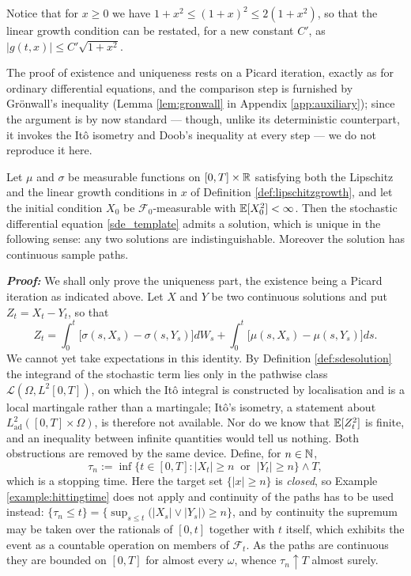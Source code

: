  Notice that for $x\geq 0$ we have $1+x^2 \leq (1+x) ^2 \leq 2(1+x^2)$, so that the linear growth condition can be restated, for a new constant $C'$, as $|g(t,x)| \leq C' \sqrt{1+x^2}.$

The proof of existence and uniqueness rests on a Picard iteration, exactly as for ordinary differential equations, and the comparison step is furnished by Grönwall's inequality (Lemma \ref{lem:gronwall} in Appendix \ref{app:auxiliary}); since the argument is by now standard --- though, unlike its deterministic counterpart, it invokes the Itô isometry and Doob's inequality at every step --- we do not reproduce it here.

\begin{theorem}\label{thm:sdeexistence}
    Let $\mu$ and $\sigma$ be measurable functions on $[0,T] \times \mathbb{R}$ satisfying both the Lipschitz and the linear growth conditions in $x$ of Definition \ref{def:lipschitzgrowth}, and let the initial condition $X_0$ be $\mathcal{F}_0$-measurable with $\mathbb{E}[X_0^2] < \infty$. Then the stochastic differential equation \eqref{sde_template} admits a solution, which is unique in the following sense: any two solutions are indistinguishable. Moreover the solution has continuous sample paths.
\end{theorem}
\textbf{\textit{Proof:}}
We shall only prove the uniqueness part, the existence being a Picard iteration as indicated above.
Let $X$ and $Y$ be two continuous solutions and put $Z_t = X_t - Y_t$, so that
\[
Z_t = \int_0^t \bigl[\sigma(s,X_s)-\sigma(s,Y_s)\bigr]dW_s + \int_0^t \bigl[\mu(s,X_s)-\mu(s,Y_s)\bigr]ds .
\]
We cannot yet take expectations in this identity. By Definition \ref{def:sdesolution} the integrand
of the stochastic term lies only in the pathwise class $\mathcal{L}(\Omega,L^2[0,T])$, on which the
Itô integral is constructed by localisation and is a local martingale rather than a martingale; Itô's
isometry, a statement about $L^2_{\mathrm{ad}}([0,T]\times\Omega)$, is therefore not available. Nor do we know
that $\mathbb{E}[Z_t^2]$ is finite, and an inequality between infinite quantities would tell us
nothing. Both obstructions are removed by the same device. Define, for $n \in \mathbb{N}$,
\begin{equation}\label{eq:sdelocalising}
\tau_n := \inf\bigl\{t \in [0,T] : |X_t| \geq n \ \text{ or } \ |Y_t| \geq n\bigr\} \wedge T ,
\end{equation}
which is a stopping time. Here the target set $\{|x|\geq n\}$ is \emph{closed}, so Example
\ref{example:hittingtime} does not apply and continuity of the paths has to be used instead:
$\{\tau_n \leq t\} = \bigl\{\sup_{s\leq t}\bigl(|X_s|\vee|Y_s|\bigr) \geq n\bigr\}$, and by continuity
the supremum may be taken over the rationals of $[0,t]$ together with $t$ itself, which exhibits the
event as a countable operation on members of $\mathcal{F}_t$. As the paths are continuous they are
bounded on $[0,T]$ for almost every $\omega$, whence $\tau_n \uparrow T$ almost surely.

